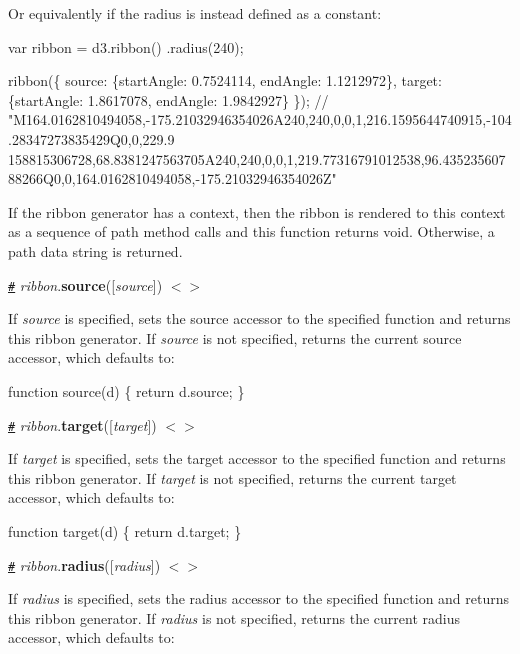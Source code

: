 Or equivalently if the radius is instead defined as a constant\+:


\begin{DoxyCode}
var ribbon = d3.ribbon()
    .radius(240);

ribbon(\{
  source: \{startAngle: 0.7524114, endAngle: 1.1212972\},
  target: \{startAngle: 1.8617078, endAngle: 1.9842927\}
\}); //
       "M164.0162810494058,-175.21032946354026A240,240,0,0,1,216.1595644740915,-104.28347273835429Q0,0,229.9
      158815306728,68.8381247563705A240,240,0,0,1,219.77316791012538,96.43523560788266Q0,0,164.0162810494058,-175.21032946354026Z"
\end{DoxyCode}


If the ribbon generator has a context, then the ribbon is rendered to this context as a sequence of path method calls and this function returns void. Otherwise, a path data string is returned.

\href{#ribbon_source}{\tt \#} {\itshape ribbon}.{\bfseries source}(\mbox{[}{\itshape source}\mbox{]}) \href{https://github.com/d3/d3-chord/blob/master/src/ribbon.js#L74}{\tt $<$$>$}

If {\itshape source} is specified, sets the source accessor to the specified function and returns this ribbon generator. If {\itshape source} is not specified, returns the current source accessor, which defaults to\+:


\begin{DoxyCode}
function source(d) \{
  return d.source;
\}
\end{DoxyCode}


\href{#ribbon_target}{\tt \#} {\itshape ribbon}.{\bfseries target}(\mbox{[}{\itshape target}\mbox{]}) \href{https://github.com/d3/d3-chord/blob/master/src/ribbon.js#L78}{\tt $<$$>$}

If {\itshape target} is specified, sets the target accessor to the specified function and returns this ribbon generator. If {\itshape target} is not specified, returns the current target accessor, which defaults to\+:


\begin{DoxyCode}
function target(d) \{
  return d.target;
\}
\end{DoxyCode}


\href{#ribbon_radius}{\tt \#} {\itshape ribbon}.{\bfseries radius}(\mbox{[}{\itshape radius}\mbox{]}) \href{https://github.com/d3/d3-chord/blob/master/src/ribbon.js#L62}{\tt $<$$>$}

If {\itshape radius} is specified, sets the radius accessor to the specified function and returns this ribbon generator. If {\itshape radius} is not specified, returns the current radius accessor, which defaults to\+:


